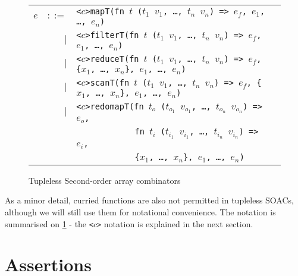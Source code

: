 \begin{figure}[bt]
\begin{tabular}{lrll}
$e$ & $::=$ & \texttt{<$c$>mapT(fn $t$ ($t_{1}$ $v_{1}$, \ldots, $t_{n}$ $v_{n}$) => $e_f$, $e_{1}$, \ldots, $e_{n}$)} \\
    & $|$ & \texttt{<$c$>filterT(fn $t$ ($t_{1}$ $v_{1}$, \ldots, $t_{n}$ $v_{n}$) => $e_f$, $e_{1}$, \ldots, $e_{n}$)} \\
    & $|$ & \texttt{<$c$>reduceT(fn $t$ ($t_{1}$ $v_{1}$, \ldots, $t_{n}$ $v_{n}$) => $e_f$, \{$x_{1}$, \ldots, $x_{n}$\}, $e_{1}$, \ldots, $e_{n}$)} \\
    & $|$ & \texttt{<$c$>scanT(fn $t$ ($t_{1}$ $v_{1}$, \ldots, $t_{n}$ $v_{n}$) => $e_f$, \{$x_{1}$, \ldots, $x_{n}$\}, $e_{1}$, \ldots, $e_{n}$)} \\
    & $|$ & \texttt{<$c$>redomapT(fn $t_{o}$ ($t_{o_{1}}$ $v_{o_{1}}$, \ldots, $t_{o_{n}}$ $v_{o_{n}}$) => $e_o$,} \\
    &     & \texttt{\ \ \ \ \ \ \ \ \ \ \ \ fn $t_{i}$ ($t_{i_{1}}$ $v_{i_{1}}$, \ldots, $t_{i_{n}}$ $v_{i_{n}}$) => $e_i$,} \\
    &     & \texttt{\ \ \ \ \ \ \ \ \ \ \ \ \{$x_{1}$, \ldots, $x_{n}$\}, $e_{1}$, \ldots, $e_{n}$)} \\
\end{tabular}
\caption{Tupleless Second-order array combinators}
\label{fig:tupleless-soacs}
\end{figure}

As a minor detail, curried functions are also not permitted in
tupleless SOACs, although we will still use them for notational
convenience.  The notation is summarised on \cref{fig:tupleless-soacs}
- the \texttt{<$c$>} notation is explained in the next section.

\section{Assertions}
\label{sec:assertions}


